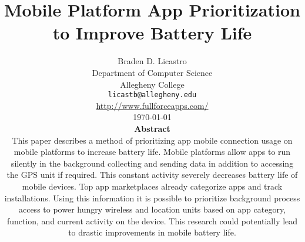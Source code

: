\documentclass[11pt]{article}
\def\widow#1{\vskip #1\vbadness10000\penalty-200\vskip-#1}
\begin{document}



\def\widow#1{\vskip #1\vbadness10000\penalty-200\vskip-#1}


\makeatletter

\def\maketitle{%
  \thispagestyle{empty}%
  \begin{center}%
    {\Huge \@title\par}%
    {\normalsize \@author\par}%
    \vskip .4in
  \end{center}%

  }

\makeatother

\vspace*{-1.1in}
\title{Mobile Platform App Prioritization to Improve Battery Life}

\author{Braden D. Licastro\\
Department of Computer Science\\
Allegheny College \\
{\tt licastb@allegheny.edu}  \\
\url{http://www.fullforceapps.com/} \\ 
\vspace*{.1in} \today \\ \vspace*{.1in}
{\bf Abstract} \\ This paper describes a method of prioritizing app mobile connection usage on mobile platforms to increase battery life. Mobile platforms allow apps to run silently in the background collecting and sending data in addition to accessing the GPS unit if required. This constant activity severely decreases battery life of mobile devices. Top app marketplaces already categorize apps and track installations. Using this information it is possible to prioritize background process access to power hungry wireless and location units based on app category, function, and current activity on the device. This research could potentially lead to drastic improvements in mobile battery life.}
\end{document}
